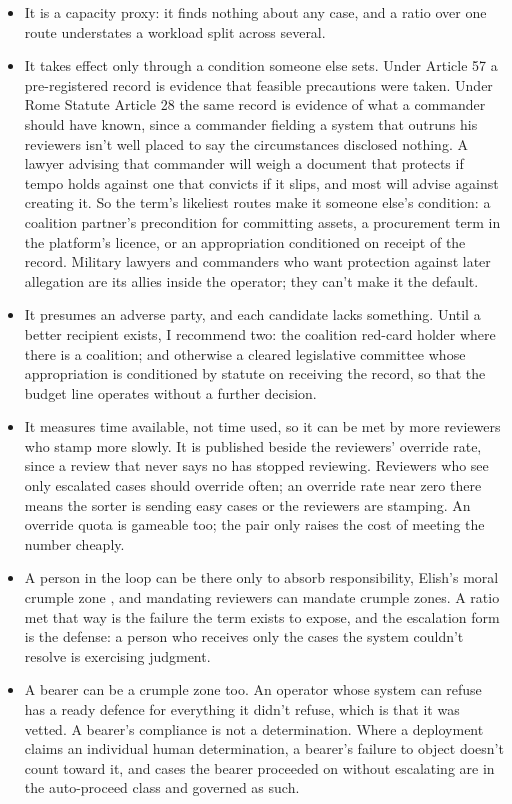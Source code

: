 \begin{itemize}
\item It is a capacity proxy: it finds nothing about any case, and a ratio over one route understates a workload split across several.
\item It takes effect only through a condition someone else sets. Under Article 57 a pre-registered record is evidence that feasible precautions were taken. Under Rome Statute Article 28 the same record is evidence of what a commander should have known, since a commander fielding a system that outruns his reviewers isn't well placed to say the circumstances disclosed nothing. A lawyer advising that commander will weigh a document that protects if tempo holds against one that convicts if it slips, and most will advise against creating it. So the term's likeliest routes make it someone else's condition: a coalition partner's precondition for committing assets, a procurement term in the platform's licence, or an appropriation conditioned on receipt of the record. Military lawyers and commanders who want protection against later allegation are its allies inside the operator; they can't make it the default.
\item It presumes an adverse party, and each candidate lacks something. Until a better recipient exists, I recommend two: the coalition red-card holder where there is a coalition; and otherwise a cleared legislative committee whose appropriation is conditioned by statute on receiving the record, so that the budget line operates without a further decision.
\item It measures time available, not time used, so it can be met by more reviewers who stamp more slowly. It is published beside the reviewers' override rate, since a review that never says no has stopped reviewing. Reviewers who see only escalated cases should override often; an override rate near zero there means the sorter is sending easy cases or the reviewers are stamping. An override quota is gameable too; the pair only raises the cost of meeting the number cheaply.
\item A person in the loop can be there only to absorb responsibility, Elish's moral crumple zone \autocite{Elish2019CrumpleZones}, and mandating reviewers can mandate crumple zones. A ratio met that way is the failure the term exists to expose, and the escalation form is the defense: a person who receives only the cases the system couldn't resolve is exercising judgment.
\item A bearer can be a crumple zone too. An operator whose system can refuse has a ready defence for everything it didn't refuse, which is that it was vetted. A bearer's compliance is not a determination. Where a deployment claims an individual human determination, a bearer's failure to object doesn't count toward it, and cases the bearer proceeded on without escalating are in the auto-proceed class and governed as such.
\end{itemize}


